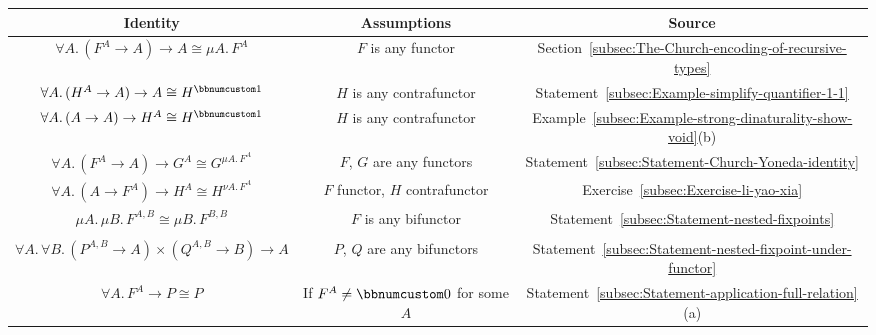 \begin{table}
\begin{centering}
\begin{tabular}{|c|c|c|}
\hline 
\textbf{\footnotesize{}Identity} & \textbf{\footnotesize{}Assumptions} & \textbf{\footnotesize{}Source}\tabularnewline
\hline 
\hline 
{\footnotesize{}$\forall A.\,(F^{A}\rightarrow A)\rightarrow A\cong\mu A.\,F^{A}$} & {\footnotesize{}$F$ is any functor} & {\footnotesize{}Section~\ref{subsec:The-Church-encoding-of-recursive-types}}\tabularnewline
\hline 
{\footnotesize{}$\forall A.\,(H^{A}\rightarrow A)\rightarrow A\cong H^{\bbnum 1}$} & {\footnotesize{}$H$ is any contrafunctor} & {\footnotesize{}Statement~\ref{subsec:Example-simplify-quantifier-1-1}}\tabularnewline
\hline 
{\footnotesize{}$\forall A.\,(A\rightarrow A)\rightarrow H^{A}\cong H^{\bbnum 1}$} & {\footnotesize{}$H$ is any contrafunctor} & {\footnotesize{}Example~\ref{subsec:Example-strong-dinaturality-show-void}(b)}\tabularnewline
\hline 
{\footnotesize{}$\forall A.\,(F^{A}\rightarrow A)\rightarrow G^{A}\cong G^{\mu A.\,F^{A}}$} & {\footnotesize{}$F$, $G$ are any functors} & {\footnotesize{}Statement~\ref{subsec:Statement-Church-Yoneda-identity}}\tabularnewline
\hline 
{\footnotesize{}$\forall A.\,(A\rightarrow F^{A})\rightarrow H^{A}\cong H^{\nu A.\,F^{A}}$} & {\footnotesize{}$F$ functor, $H$ contrafunctor} & {\footnotesize{}Exercise~\ref{subsec:Exercise-li-yao-xia}}\tabularnewline
\hline 
{\footnotesize{}$\mu A.\,\mu B.\,F^{A,B}\cong\mu B.\,F^{B,B}$} & {\footnotesize{}$F$ is any bifunctor} & {\footnotesize{}Statement~\ref{subsec:Statement-nested-fixpoints}}\tabularnewline
\hline 
{\footnotesize{}}%
\begin{minipage}[c][12mm][t]{0.1mm}%
%
\end{minipage}{\footnotesize{}}%
\begin{minipage}[c]{0.43\columnwidth}%
\begin{center}
{\footnotesize{}$\mu A.\,P^{A,\,\mu B.\,Q^{A,B}}\cong$}\\
{\footnotesize{}$\forall A.\,\forall B.\,(P^{A,B}\rightarrow A)\times(Q^{A,B}\rightarrow B)\rightarrow A$}
\par\end{center}%
\end{minipage} & {\footnotesize{}$P$, $Q$ are any bifunctors} & {\footnotesize{}Statement~\ref{subsec:Statement-nested-fixpoint-under-functor}}\tabularnewline
\hline 
{\footnotesize{}$\forall A.\,F^{A}\rightarrow P\cong P$} & {\footnotesize{}If $F^{A}\neq\bbnum 0$ for some $A$} & {\footnotesize{}Statement~\ref{subsec:Statement-application-full-relation}(a)}\tabularnewline

\end{tabular}
\end{centering}
\end{table}
